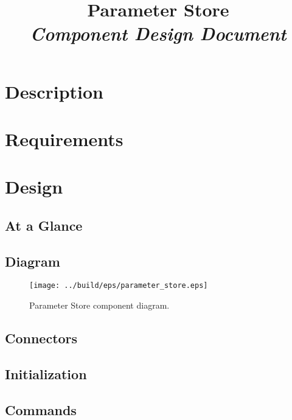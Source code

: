 



\title{\textbf{Parameter Store} \\
\large\textit{Component Design Document}}
\date{}
\maketitle

\section{Description}


\section{Requirements}


\section{Design}

\subsection{At a Glance}


\subsection{Diagram}
\begin{figure}[H]
  \texttt{[image: ../build/eps/parameter\_store.eps]}
  \caption{Parameter Store component diagram.}
\end{figure}

\subsection{Connectors}


\subsection{Initialization}


\subsection{Commands}

